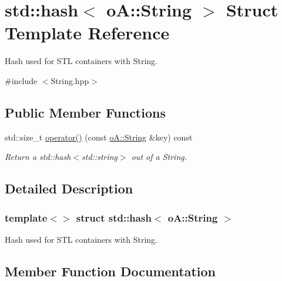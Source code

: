 \hypertarget{structstd_1_1hash_3_01o_a_1_1_string_01_4}{}\section{std\+:\+:hash$<$ oA\+:\+:String $>$ Struct Template Reference}
\label{structstd_1_1hash_3_01o_a_1_1_string_01_4}


Hash used for S\+TL containers with String.  




{\ttfamily \#include $<$String.\+hpp$>$}

\subsection*{Public Member Functions}
\begin{DoxyCompactItemize}
\item 
std\+::size\+\_\+t \mbox{\hyperlink{structstd_1_1hash_3_01o_a_1_1_string_01_4_a6e23a430fd8bccdc9acf379573e16403}{operator()}} (const \mbox{\hyperlink{classo_a_1_1_string}{o\+A\+::\+String}} \&key) const
\begin{DoxyCompactList}\small\item\em Return a std\+::hash$<$std\+::string$>$ out of a String. \end{DoxyCompactList}\end{DoxyCompactItemize}


\subsection{Detailed Description}
\subsubsection*{template$<$$>$\newline
struct std\+::hash$<$ o\+A\+::\+String $>$}

Hash used for S\+TL containers with String. 

\subsection{Member Function Documentation}
\mbox{\label{structstd_1_1hash_3_01o_a_1_1_string_01_4_a6e23a430fd8bccdc9acf379573e16403}} 
